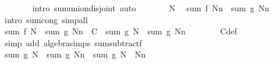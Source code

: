 \begin{isabellebody}
\ \ \ \ \ \ \isamarkupfalse%
\ {\isacharparenleft}{\kern0pt}intro\ sum{\isachardot}{\kern0pt}union{\isacharunderscore}{\kern0pt}disjoint{\isacharparenright}{\kern0pt}\ auto\isanewline
\ \ \ \ \isamarkupfalse%
\ \isamarkupfalse%
\ N\ \isamarkupfalse%
\ {\isachardoublequoteopen}sum\ f\ {\isacharbraceleft}{\kern0pt}N{\isachardot}{\kern0pt}{\isachardot}{\kern0pt}{\isacharless}{\kern0pt}n{\isacharbraceright}{\kern0pt}\ {\isacharequal}{\kern0pt}\ sum\ g\ {\isacharbraceleft}{\kern0pt}N{\isachardot}{\kern0pt}{\isachardot}{\kern0pt}{\isacharless}{\kern0pt}n{\isacharbraceright}{\kern0pt}{\isachardoublequoteclose}\isanewline
\ \ \ \ \ \ \isamarkupfalse%
\ {\isacharparenleft}{\kern0pt}intro\ sum{\isachardot}{\kern0pt}cong{\isacharparenright}{\kern0pt}\ simp{\isacharunderscore}{\kern0pt}all\isanewline
\ \ \ \ \isamarkupfalse%
\ \isamarkupfalse%
\ {\isachardoublequoteopen}sum\ f\ {\isacharbraceleft}{\kern0pt}{\isachardot}{\kern0pt}{\isachardot}{\kern0pt}{\isacharless}{\kern0pt}N{\isacharbraceright}{\kern0pt}\ {\isacharplus}{\kern0pt}\ sum\ g\ {\isacharbraceleft}{\kern0pt}N{\isachardot}{\kern0pt}{\isachardot}{\kern0pt}{\isacharless}{\kern0pt}n{\isacharbraceright}{\kern0pt}\ {\isacharequal}{\kern0pt}\ C\ {\isacharplus}{\kern0pt}\ {\isacharparenleft}{\kern0pt}sum\ g\ {\isacharbraceleft}{\kern0pt}{\isachardot}{\kern0pt}{\isachardot}{\kern0pt}{\isacharless}{\kern0pt}N{\isacharbraceright}{\kern0pt}\ {\isacharplus}{\kern0pt}\ sum\ g\ {\isacharbraceleft}{\kern0pt}N{\isachardot}{\kern0pt}{\isachardot}{\kern0pt}{\isacharless}{\kern0pt}n{\isacharbraceright}{\kern0pt}{\isacharparenright}{\kern0pt}{\isachardoublequoteclose}\isanewline
\ \ \ \ \ \ \isamarkupfalse%
\ C{\isacharunderscore}{\kern0pt}def\ \isamarkupfalse%
\ {\isacharparenleft}{\kern0pt}simp\ add{\isacharcolon}{\kern0pt}\ algebra{\isacharunderscore}{\kern0pt}simps\ sum{\isacharunderscore}{\kern0pt}subtractf{\isacharparenright}{\kern0pt}\isanewline
\ \ \ \ \isamarkupfalse%
\ \isamarkupfalse%
\ {\isachardoublequoteopen}sum\ g\ {\isacharbraceleft}{\kern0pt}{\isachardot}{\kern0pt}{\isachardot}{\kern0pt}{\isacharless}{\kern0pt}N{\isacharbraceright}{\kern0pt}\ {\isacharplus}{\kern0pt}\ sum\ g\ {\isacharbraceleft}{\kern0pt}N{\isachardot}{\kern0pt}{\isachardot}{\kern0pt}{\isacharless}{\kern0pt}n{\isacharbraceright}{\kern0pt}\ {\isacharequal}{\kern0pt}\ sum\ g\ {\isacharparenleft}{\kern0pt}{\isacharbraceleft}{\kern0pt}{\isachardot}{\kern0pt}{\isachardot}{\kern0pt}{\isacharless}{\kern0pt}N{\isacharbraceright}{\kern0pt}\ {\isasymunion}\ {\isacharbraceleft}{\kern0pt}N{\isachardot}{\kern0pt}{\isachardot}{\kern0pt}{\isacharless}{\kern0pt}n{\isacharbraceright}{\kern0pt}{\isacharparenright}{\kern0pt}{\isachardoublequoteclose}\isanewline

\end{isabellebody}

